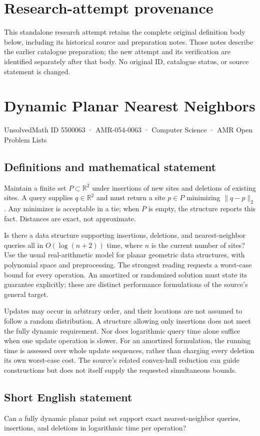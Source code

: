 \documentclass[11pt,a4paper]{article}
\begin{document}
\section*{Research-attempt provenance}
This standalone research attempt retains the complete original definition body below,
including its historical source and preparation notes. Those notes describe the
earlier catalogue preparation; the new attempt and its verification are identified
separately after that body. No original ID, catalogue status, or source statement is changed.

\section*{Dynamic Planar Nearest Neighbors}\label{5500063}
{\small UnsolvedMath ID 5500063 · AMR-054-0063 · Computer Science · AMR Open Problem Lists}
\subsection{Definitions and mathematical statement}
Maintain a finite set $P\subset\mathbb R^2$ under insertions of
new sites and deletions of existing sites. A query supplies
$q\in\mathbb R^2$ and must return a site $p\in P$ minimizing
$\|q-p\|_2$. Any minimizer is acceptable in a tie; when $P$ is
empty, the structure reports this fact. Distances are exact,
not approximate.

Is there a data structure supporting insertions, deletions,
and nearest-neighbor queries all in $O(\log(n+2))$ time, where
$n$ is the current number of sites? Use the usual real-arithmetic
model for planar geometric data structures, with polynomial
space and preprocessing. The strongest reading requests a
worst-case bound for every operation. An amortized or randomized
solution must state its guarantee explicitly; these are distinct
performance formulations of the source's general target.

Updates may occur in arbitrary order, and their locations are
not assumed to follow a random distribution. A structure allowing
only insertions does not meet the fully dynamic requirement.
Nor does logarithmic query time alone suffice when one update
operation is slower. For an amortized formulation, the running
time is assessed over whole update sequences, rather than
charging every deletion its own worst-case cost. The source's
related convex-hull reduction can guide constructions but does
not itself supply the requested simultaneous bounds.
\subsection{Short English statement}
Can a fully dynamic planar point set support exact nearest-neighbor queries, insertions, and deletions in logarithmic time per operation?
\end{document}
